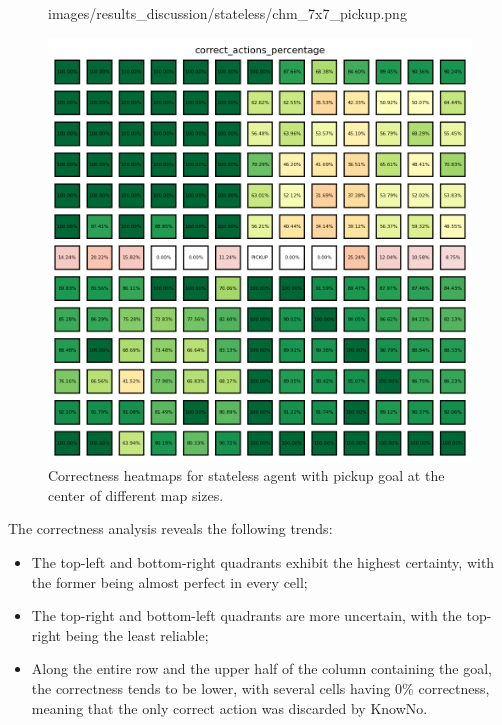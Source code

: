 \begin{figure}[h]
\begin{minipage}[b]{0.32\textwidth}
{      images/results_discussion/stateless/chm_7x7_pickup.png
    }
    \caption{$7 \times 7$}
    \label{fig:chm_7x7_pickup}
  \end{minipage}
  \hfill
  \begin{minipage}[b]{0.32\textwidth}
    \centering
    \includegraphics[width=\textwidth]{
      images/results_discussion/stateless/chm_13x13_pickup.png
    }
    \caption{$13 \times 13$}
    \label{fig:chm_13x13_pickup}
  \end{minipage}
  \caption{Correctness heatmaps for stateless agent with pickup goal at the
  center of different map sizes.}
  \label{fig:stateless_pickup_correctness}
\end{figure}
\vspace{5mm}

The correctness analysis reveals the following trends:
\begin{itemize}
  \item The top-left and bottom-right quadrants exhibit the highest certainty,
    with the former being almost perfect in every cell;

  \item The top-right and bottom-left quadrants are more uncertain, with the top-right
    being the least reliable;

  \item Along the entire row and the upper half of the column containing the goal,
    the correctness tends to be lower, with several cells having 0\% correctness,
    meaning that the only correct action was discarded by KnowNo.
\end{itemize}

